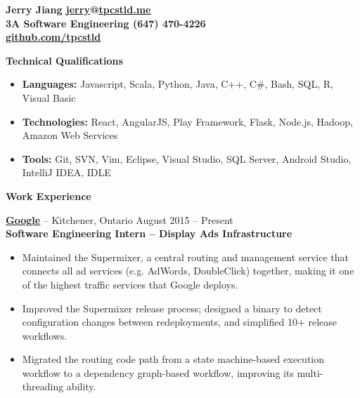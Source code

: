 \documentclass{letter}
\begin{document}
  \thispagestyle{empty}


{\bfseries
  {\Large Jerry Jiang} \hfill \href{mailto:jerry@tpcstld.me}{\uline{jerry}}@\href{http://tpcstld.me}{\uline{tpcstld.me}} \\
  3A Software Engineering \hfill (647) 470-4226 \\
\null \hfill \href{https://github.com/tpcstld}{\uline{github.com/tpcstld}}} \\
\null \hrulefill

{\bfseries \Large Technical Qualifications}
\vspace{-3mm}
\begin{itemize}
    \item {\bfseries Languages:}
        Javascript, Scala, Python, Java, C++, C\#, Bash, SQL, R, Visual Basic
    \item {\bfseries Technologies:}
        React, AngularJS, Play Framework, Flask, Node.js, Hadoop, Amazon Web Services
    \item {\bfseries Tools:}
        Git, SVN, Vim, Eclipse, Visual Studio, SQL Server, Android Studio, IntelliJ IDEA, IDLE
\end{itemize}

{\bfseries \Large Work Experience}

\vspace{-1.5mm}
{\bfseries \href{https://www.google.com}{\uline{Google}}} -- Kitchener, Ontario \hfill August 2015 -- Present \\
{\bfseries Software Engineering Intern -- Display Ads Infrastructure}
\vspace{-3mm}
\begin{itemize}
    \item Maintained the Supermixer, a central routing and management service
      that connects all ad services (e.g. AdWords, DoubleClick) together, making
      it one of the highest traffic services that Google deploys.
    \item Improved the Supermixer release process; designed a binary to detect
      configuration changes between redeployments, and simplified 10+
      release workflows.
    \item Migrated the routing code path from a state machine-based execution
        workflow to a dependency graph-based workflow, improving its
        multi-threading ability.
\end{itemize}
\end{document}
